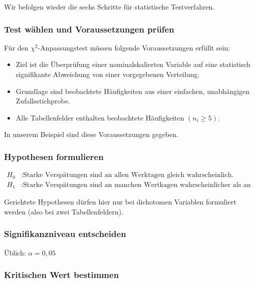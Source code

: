 \documentclass[
  ngerman,
]{article}
\providecommand{\tightlist}{%
  \setlength{\itemsep}{0pt}\setlength{\parskip}{0pt}}
\begin{document}
Wir befolgen wieder die sechs Schritte für statistische Testverfahren.

\hypertarget{test-wuxe4hlen-und-voraussetzungen-pruxfcfen-5}{%
\subsubsection{Test wählen und Voraussetzungen prüfen}\label{test-wuxe4hlen-und-voraussetzungen-pruxfcfen-5}}

Für den \(\chi^2\)-Anpassungstest müssen folgende Voraussetzungen erfüllt sein:

\begin{itemize}
\tightlist
\item
  Ziel ist die Überprüfung einer nominalskalierten Variable auf eine statistisch signifikante Abweichung von einer vorgegebenen Verteilung.
\item
  Grundlage sind beobachtete Häufigkeiten aus einer einfachen, unabhängigen Zufallsstichprobe.
\item
  Alle Tabellenfelder enthalten beobachtete Häufigkeiten \((n_{i}\geq 5)\).
\end{itemize}

In unserem Beispiel sind diese Voraussetzungen gegeben.

\hypertarget{hypothesen-formulieren-5}{%
\subsubsection{Hypothesen formulieren}\label{hypothesen-formulieren-5}}

\[\begin{aligned}
H_0 &: \textrm{Starke Verspätungen sind an allen Werktagen gleich wahrscheinlich.}\\
H_1 &: \textrm{Starke Verspätungen sind an manchen Wertkagen wahrscheinlicher als an anderen.}
\end{aligned}\]

Gerichtete Hypothesen dürfen hier nur bei dichotomen Variablen formuliert werden (also bei zwei Tabellenfeldern).

\hypertarget{signifikanzniveau-entscheiden-5}{%
\subsubsection{Signifikanzniveau entscheiden}\label{signifikanzniveau-entscheiden-5}}

Üblich: \(\alpha=0,05\)

\hypertarget{kritischen-wert-bestimmen-1}{%
\subsubsection{Kritischen Wert bestimmen}\label{kritischen-wert-bestimmen-1}}
\end{document}
